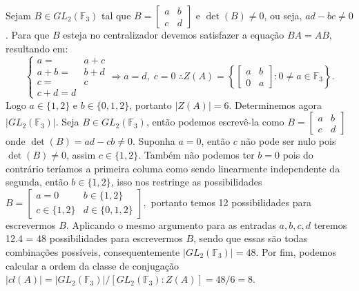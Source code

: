 \documentclass{article}
\begin{document}
\begin{enumerate}
		Sejam $B \in GL_{2}(\mathbb{F}_{3})$ tal que 
		$
		B = 
		\left[
		\begin{array}{cc}
		a & b \\
		c & d
		\end{array}
		\right]
		$
		e $\det(B) \neq 0$, ou seja, $ad-bc \neq 0$. Para que $B$ esteja no centralizador devemos satisfazer a equação $BA= AB$, resultando em:
		$$
		\left\{
		\begin{aligned}
		a =& a+c 
		\\
		a+b =& b + d
		\\
		c =& c
		\\
		c+d = d
		\end{aligned}
		\right.
		\Rightarrow
		a = d, \; c = 0 \; 
		\therefore Z(A) = 
		\left\{
		\left[
		\begin{array}{cc}
		a & b \\
		0 & a
		\end{array}
		\right]
		: 0 \neq a \in \mathbb{F}_{3}\right\}.
		$$
		Logo $a \in \{1,2\}$ e $b \in \{0,1,2\}$, portanto $|Z(A)| = 6$. Determinemos agora $|GL_{2}(\mathbb{F}_{3})|$. Seja $B \in GL_{2}(\mathbb{F}_{3})$, então podemos escrevê-la como
		$
		B = 
		\left[
		\begin{array}{cc}
		a & b \\
		c & d
		\end{array}
		\right]
		$
		onde $\det(B) = ad-cb \neq 0$. Suponha $a =0$, então $c$ não pode ser nulo pois $\det(B) \neq 0$, assim $c \in \{1,2\}$. Também não podemos ter $b=0$ pois do contrário teríamos a primeira columa como sendo linearmente independente da segunda, então $b \in \{1,2\}$, isso nos restringe as possibilidades
		$
		B = 
		\left[
		\begin{array}{cc}
		a=0 & b \in \{1,2\} \\
		c \in \{1,2\} & d \in \{0,1,2\}
		\end{array}
		\right],
		$
		portanto temos 12 possibilidades para escrevermos $B$. Aplicando o mesmo argumento para as entradas $a, b, c, d$ teremos 12.4 = 48 possibilidades para escrevermos $B$, sendo que essas são todas combinações possíveis, consequentemente $|GL_{2}(\mathbb{F}_{3})| = 48$. Por fim, podemos calcular a ordem da classe de conjugação $|cl(A)| = |GL_{2}(\mathbb{F}_{3})|/[GL_{2}(\mathbb{F}_{3}):Z(A)] = 48/6 = 8$.
	\end{enumerate}
	
	
\end{document}
